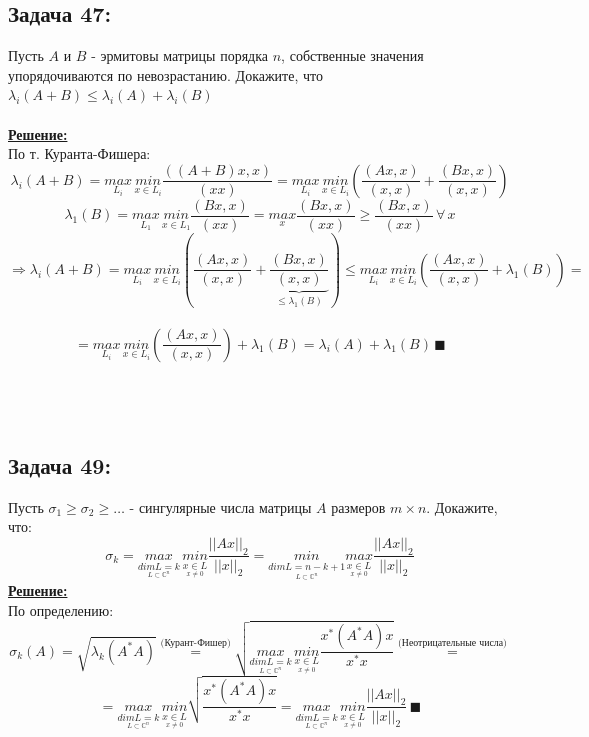 \documentclass[a4paper,12pt,titlepage,final]{article}
\begin{document}
\subsection*{Задача 47:}
\noindent Пусть $A$ и $B$ - эрмитовы матрицы порядка $n$, собственные значения упорядочиваются по невозрастанию. Докажите, что $\lambda_{i}(A + B) \leq \lambda_{i}(A) + \lambda_{i}(B)$ \\ \\
\textbf{\underline{Решение:}} \\
По т. Куранта-Фишера: \\
$$\lambda_{i}(A + B) = \underset{L_{i}}{max} \, \underset{x \in L_{i}}{min} \frac{((A + B)x, x)}{(x x)} = 
\underset{L_{i}}{max} \, \underset{x \in L_{i}}{min} \left(\frac{(Ax, x)}{(x, x)} + \frac{(Bx, x)}{(x, x)}\right)$$
$$\lambda_1(B) = \underset{L_1}{max} \, \underset{x \in L_1}{min} \frac{(Bx, x)}{(x x)} = \underset{x}{max}\frac{(Bx, x)}{(x x)} \geq \frac{(Bx, x)}{(x x)} \,\forall\, x$$
$$ \Rightarrow \lambda_{i}(A + B) = \underset{L_{i}}{max} \, \underset{x \in L_{i}}{min} \left(\frac{(Ax, x)}{(x, x)} + \underbrace{\frac{(Bx, x)}{(x, x)}}_{\leq \lambda_1(B)}\right) \leq
\underset{L_{i}}{max} \, \underset{x \in L_{i}}{min} \left(\frac{(Ax, x)}{(x, x)} + \lambda_1(B)\right) =$$ \\ 
$$= \underset{L_{i}}{max} \, \underset{x \in L_{i}}{min} \left(\frac{(Ax, x)}{(x, x)}\right) + \lambda_1(B) = \lambda_{i}(A) + \lambda_1(B) \,\blacksquare$$\\ \\ \\

\subsection*{Задача 49:}
\noindent Пусть $\sigma_1 \geq \sigma_2 \geq \ldots$ - сингулярные числа матрицы $A$ размеров $m \times n$. Докажите, что: \\
$$
\sigma_{k} = \underset{\underset{L \subset \mathbb{C}^n}{dim L = k}}{max} \, \underset{\underset{x \neq 0}{x \in L}}{min} \frac{||Ax||_2}{||x||_2} = 
\underset{\underset{L \subset \mathbb{C}^n}{dim L = n - k + 1}}{min} \underset{\underset{x \neq 0}{x \in L}}{max} \frac{||Ax||_2}{||x||_2} $$
\textbf{\underline{Решение:}} \\
По определению: \\
$$
\sigma_{k}(A) = \sqrt{\lambda_{k}(A^*A)} \overset{\text{(Курант-Фишер)}}{=} 
\sqrt{\underset{\underset{L \subset \mathbb{C}^n}{dim L = k}}{max} \, \underset{\underset{x \neq 0}{x \in L}}{min} \frac{x^*(A^*A)x}{x^*x}} \overset{\text{(Неотрицательные числа)}}{=} $$ 
$$
= \underset{\underset{L \subset \mathbb{C}^n}{dim L = k}}{max} \, \underset{\underset{x \neq 0}{x \in L}}{min} \sqrt{\frac{x^*(A^*A)x}{x^*x}} =
\underset{\underset{L \subset \mathbb{C}^n}{dim L = k}}{max} \, \underset{\underset{x \neq 0}{x \in L}}{min} \frac{||Ax||_2}{||x||_2} \,\blacksquare $$ \\ \\ \\
\end{document}
